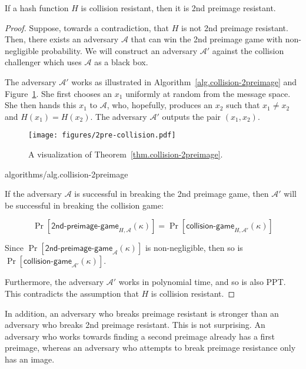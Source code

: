 \begin{theorem}
  \label{thm.collision-2preimage}
  If a hash function $H$ is collision resistant, then it is 2nd preimage resistant.
\end{theorem}
\begin{proof}
  Suppose, towards a contradiction, that $H$ is not 2nd preimage resistant.
  Then, there exists an adversary $\mathcal{A}$ that can win the 2nd preimage game with non-negligible probability. We will construct an adversary $\mathcal{A}'$ against the
  collision challenger which uses $\mathcal{A}$ as a black box.

  The adversary $\mathcal{A}'$ works as illustrated in Algorithm~\ref{alg.collision-2preimage} and Figure~\ref{fig.2pre-collision}. She first chooses an $x_1$ uniformly at random from the message space. She then hands this $x_1$ to $\mathcal{A}$, who, hopefully, produces an $x_2$ such that $x_1 \neq x_2$ and $H(x_1) = H(x_2)$. The adversary $\mathcal{A}'$ outputs the pair $(x_1, x_2)$.

  \begin{figure}[H]
      \centering
      \texttt{[image: figures/2pre-collision.pdf]}
      \caption{A visualization of Theorem~\ref{thm.collision-2preimage}.}
      \label{fig.2pre-collision}
  \end{figure}

  {algorithms/alg.collision-2preimage}

  If the adversary $\mathcal{A}$ is successful in breaking the 2nd preimage game, then $\mathcal{A}'$ will be successful in breaking the collision game:

  \[
    \Pr[\textsf{2nd-preimage-game}_{H,\mathcal{A}}(\kappa)]
    =
    \Pr[\textsf{collision-game}_{H,\mathcal{A}'}(\kappa)]
  \]

  Since $\Pr[\textsf{2nd-preimage-game}_\mathcal{A}(\kappa)]$ is non-negligible, then so is $\Pr[\textsf{collision-game}_{\mathcal{A}'}(\kappa)]$.

  Furthermore, the adversary $\mathcal{A}'$ works in polynomial time, and so is also PPT. This contradicts the assumption that $H$ is collision resistant.
\end{proof}

In addition, an adversary who breaks preimage resistant is stronger than an adversary who breaks 2nd preimage resistant. This is not surprising. An adversary who works towards finding a second preimage already has a first preimage, whereas an adversary who attempts to break preimage resistance only has an image.

